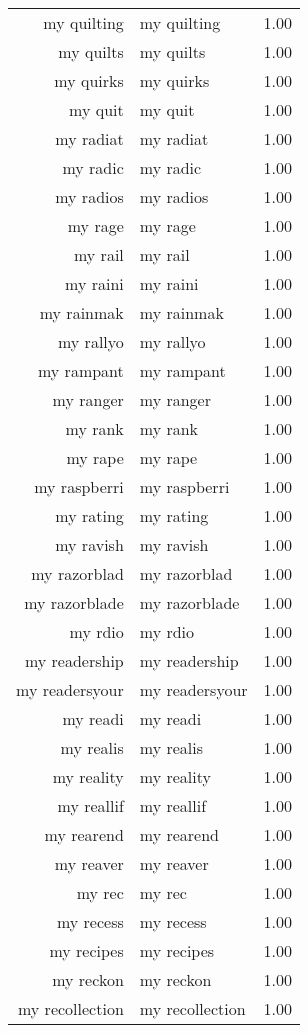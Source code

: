 \begin{table}[ht]
\begin{tabular}{rlr}
  my quilting & my quilting & 1.00 \\ 
  my quilts & my quilts & 1.00 \\ 
  my quirks & my quirks & 1.00 \\ 
  my quit & my quit & 1.00 \\ 
  my radiat & my radiat & 1.00 \\ 
  my radic & my radic & 1.00 \\ 
  my radios & my radios & 1.00 \\ 
  my rage & my rage & 1.00 \\ 
  my rail & my rail & 1.00 \\ 
  my raini & my raini & 1.00 \\ 
  my rainmak & my rainmak & 1.00 \\ 
  my rallyo & my rallyo & 1.00 \\ 
  my rampant & my rampant & 1.00 \\ 
  my ranger & my ranger & 1.00 \\ 
  my rank & my rank & 1.00 \\ 
  my rape & my rape & 1.00 \\ 
  my raspberri & my raspberri & 1.00 \\ 
  my rating & my rating & 1.00 \\ 
  my ravish & my ravish & 1.00 \\ 
  my razorblad & my razorblad & 1.00 \\ 
  my razorblade & my razorblade & 1.00 \\ 
  my rdio & my rdio & 1.00 \\ 
  my readership & my readership & 1.00 \\ 
  my readersyour & my readersyour & 1.00 \\ 
  my readi & my readi & 1.00 \\ 
  my realis & my realis & 1.00 \\ 
  my reality & my reality & 1.00 \\ 
  my reallif & my reallif & 1.00 \\ 
  my rearend & my rearend & 1.00 \\ 
  my reaver & my reaver & 1.00 \\ 
  my rec & my rec & 1.00 \\ 
  my recess & my recess & 1.00 \\ 
  my recipes & my recipes & 1.00 \\ 
  my reckon & my reckon & 1.00 \\ 
  my recollection & my recollection & 1.00 \\ 

\end{tabular}
\end{table}
